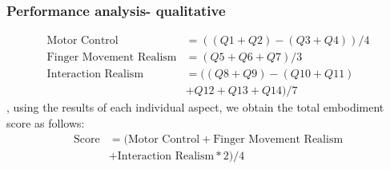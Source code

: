 \documentclass{beamer}
\theoremstyle{remark}
\theoremstyle{plain}
\begin{document}
\begin{frame}
	\frametitle{Performance analysis- qualitative}
	
	
	\begin{equation}\label{eq:6}
	\begin{split}
	\text{Motor Control} &= ((Q1 + Q2) - (Q3 + Q4)) / 4 \\
	\text{Finger Movement Realism} &= (Q5 + Q6 + Q7) / 3 \\
	\text{Interaction Realism} &= ((Q8 + Q9) - (Q10 + Q11)\\
	& + Q12 + Q13 + Q14) / 7 
	\end{split}
	\end{equation}, using the results of each individual aspect, we obtain the total embodiment score as follows:
	\begin{equation} \label{eq:5}
	\begin{split}
	\text{Score} &= (\text{Motor Control} + \text{Finger Movement Realism} \\
	& + \text{Interaction Realism} * 2) / 4
	\end{split}
	\end{equation}
	
\end{frame}
\end{document}
